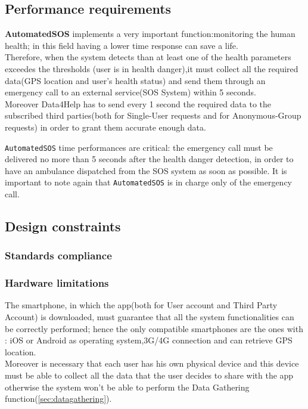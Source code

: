   \subsection{Performance requirements}
  \label{sec:performance}

    \textbf{AutomatedSOS} implements a very important function:monitoring the human health; in this field having a lower time response can save a life.\\
    Therefore, when the system detects than at least one of the health parameters exceedes the thresholds (user is in health danger),it must collect all the required data(GPS location and user's health status) and send them through an emergency call to an external service(SOS System) within 5 seconds.\\
    Moreover Data4Help has to send every 1 second the required data to the subscribed third parties(both for Single-User requests and for Anonymous-Group requests) in order to grant them accurate enough data.

    \texttt{AutomatedSOS} time performances are critical: the emergency call must be delivered no more than 5 seconds after the health danger detection, in order to have an ambulance dispatched from the SOS system as soon as possible. It is important to note again that \texttt{AutomatedSOS} is in charge only of the emergency call.

  \subsection{Design constraints}
    \subsubsection{Standards compliance}

    \subsubsection{Hardware limitations}
The smartphone, in which the app(both for User account and Third Party Account) is downloaded, must guarantee that all the system functionalities can be correctly performed; hence the only compatible smartphones are the ones with : iOS or Android as operating system,3G/4G connection and can retrieve GPS location. \\ Moreover is necessary that each user has his own physical device and this device must be able to collect all the data that the user decides to share with the app otherwise the system won't be able to perform the Data Gathering function(\ref{sec:datagathering}).

